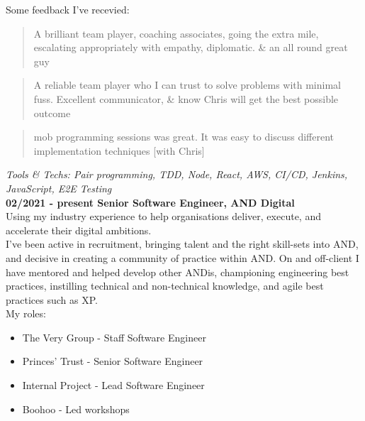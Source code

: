 Some feedback I've recevied:\\

\begin{quote}
A brilliant team player, coaching associates, going the extra mile, escalating appropriately with empathy, diplomatic. \& an all round great guy
\end{quote}

\begin{quote}
A reliable team player who I can trust to solve problems with minimal fuss. Excellent communicator, \& know Chris will get the best possible outcome
\end{quote}

\begin{quote}
mob programming sessions was great. It was easy to discuss different implementation techniques [with Chris]
\end{quote}

\emph{Tools \& Techs: Pair programming, TDD, Node, React, AWS, CI/CD, Jenkins, JavaScript, E2E Testing}\\

\textbf{02/2021 - present \hspace{2.75em}Senior Software Engineer, AND Digital}\\

Using my industry experience to help organisations deliver, execute, and accelerate their digital ambitions.\\

I've been active in recruitment, bringing talent and the right skill-sets into AND, and decisive in creating a community of practice within AND. On and off-client I have mentored and helped develop other ANDis, championing engineering best practices, instilling technical and non-technical knowledge, and agile best practices such as XP.\\

My roles:\\

\begin{itemize}
  \item The Very Group   - Staff Software Engineer
  \item Princes' Trust   - Senior Software Engineer
  \item Internal Project - Lead Software Engineer
  \item Boohoo           - Led workshops
\end{itemize}

\bigskip


